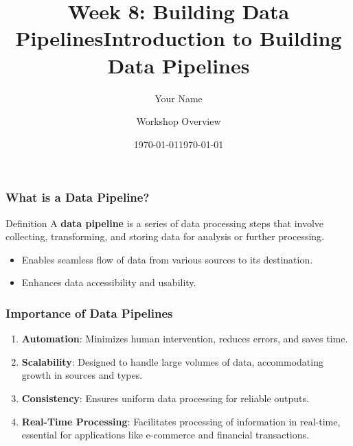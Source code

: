 \documentclass{beamer}
\title{Week 8: Building Data Pipelines}
\author{Your Name}
\institute{Your Institution}
\date{\today}
\begin{document}
\frame{\titlepage}

\begin{frame}
    \title{Introduction to Building Data Pipelines}
    \author{Workshop Overview}
    \date{\today}
    \maketitle
\end{frame}

\begin{frame}[fragile]
    \frametitle{What is a Data Pipeline?}
    \begin{block}{Definition}
        A \textbf{data pipeline} is a series of data processing steps that involve collecting, transforming, and storing data for analysis or further processing. 
    \end{block}
    \begin{itemize}
        \item Enables seamless flow of data from various sources to its destination.
        \item Enhances data accessibility and usability.
    \end{itemize}
\end{frame}

\begin{frame}[fragile]
    \frametitle{Importance of Data Pipelines}
    \begin{enumerate}
        \item \textbf{Automation}: Minimizes human intervention, reduces errors, and saves time.
        \item \textbf{Scalability}: Designed to handle large volumes of data, accommodating growth in sources and types.
        \item \textbf{Consistency}: Ensures uniform data processing for reliable outputs.
        \item \textbf{Real-Time Processing}: Facilitates processing of information in real-time, essential for applications like e-commerce and financial transactions.
    \end{enumerate}
\end{frame}
\end{document}

